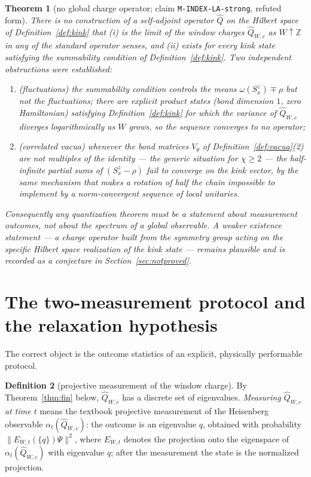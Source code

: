 \documentclass[11pt]{article}
\newtheorem{theorem}{Theorem}[section]
\theoremstyle{definition}
\newtheorem{definition}[theorem]{Definition}
\theoremstyle{remark}
\newcommand{\Z}{\mathbb{Z}}
\begin{document}
\begin{theorem}[no global charge operator; claim \texttt{M-INDEX-LA-strong},
refuted form]\label{thm:noq}
There is no construction of a self-adjoint operator $\widehat{Q}$ on the
Hilbert space of Definition~\ref{def:kink} that (i) is the limit of the
window charges $\widehat{Q}_{W,c}$ as $W\uparrow\Z$ in any of the standard
operator senses, and (ii) exists for every kink state satisfying the
summability condition of Definition~\ref{def:kink}.  Two independent
obstructions were established:
\begin{enumerate}
\item \emph{(fluctuations)} the summability condition controls the
\emph{means} $\omega(S^z_x)\mp\rho$ but not the fluctuations; there are
explicit product states (bond dimension $1$, zero Hamiltonian) satisfying
Definition~\ref{def:kink} for which the variance of $\widehat{Q}_{W,c}$
diverges logarithmically as $W$ grows, so the sequence converges to no
operator;
\item \emph{(correlated vacua)} whenever the bond matrices $V_\theta$ of
Definition~\ref{def:vacua}(2) are not multiples of the identity --- the
generic situation for $\chi\ge2$ --- the half-infinite partial sums of
$(S^z_x-\rho)$ fail to converge on the kink vector, by the same mechanism
that makes a rotation of half the chain impossible to implement by a
norm-convergent sequence of local unitaries.
\end{enumerate}
Consequently any quantization theorem must be a statement about
\emph{measurement outcomes}, not about the spectrum of a global observable.
A weaker existence statement --- a charge operator built from the symmetry
group acting on the specific Hilbert space realization of the kink state ---
remains plausible and is recorded as a conjecture in
Section~\ref{sec:notproved}.
\end{theorem}

\section{The two-measurement protocol and the relaxation hypothesis}
\label{sec:protocol}

The correct object is the outcome statistics of an explicit, physically
performable protocol.

\begin{definition}[projective measurement of the window charge]
\label{def:projmeas}
By Theorem~\ref{thm:fin} below, $\widehat{Q}_{W,c}$ has a discrete set of
eigenvalues.  \emph{Measuring $\widehat{Q}_{W,c}$ at time $t$} means the
textbook projective measurement of the Heisenberg observable
$\alpha_t(\widehat{Q}_{W,c})$: the outcome is an eigenvalue $q$, obtained
with probability $\|E_{W,t}(\{q\})\Psi\|^2$, where $E_{W,t}$ denotes the
projection onto the eigenspace of $\alpha_t(\widehat{Q}_{W,c})$ with
eigenvalue $q$; after the measurement the state is the normalized projection.
\end{definition}
\end{document}
